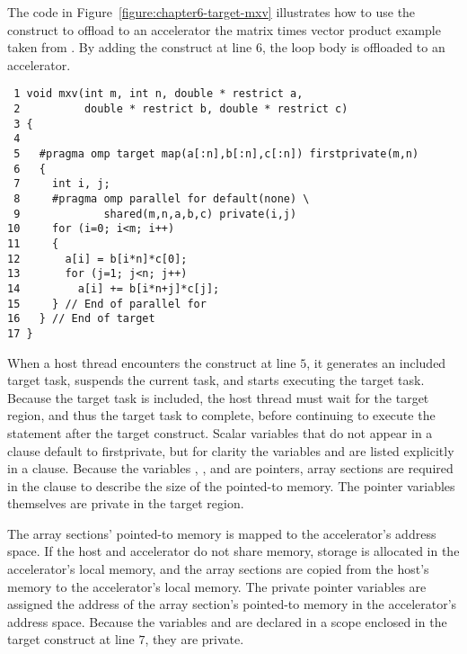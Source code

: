 The code in Figure~\ref{figure:chapter6-target-mxv} illustrates how to
use the  construct to offload to an accelerator the matrix times
vector product example taken from \cite{ChapmanEtAl:2007}.  By adding
the  construct at line $6$, the loop body is offloaded to an
accelerator.

\begin{figure*}[!tb]
\begin{verbatim}
 1 void mxv(int m, int n, double * restrict a,
 2          double * restrict b, double * restrict c)
 3 {
 4 
 5   #pragma omp target map(a[:n],b[:n],c[:n]) firstprivate(m,n)
 6   {
 7     int i, j;
 8     #pragma omp parallel for default(none) \
 9             shared(m,n,a,b,c) private(i,j)
10     for (i=0; i<m; i++)
11     {
12       a[i] = b[i*n]*c[0];
13       for (j=1; j<n; j++)
14         a[i] += b[i*n+j]*c[j];
15     } // End of parallel for
16   } // End of target
17 }
\end{verbatim}
\caption{ \textbf {Example using the target construct to execute the matrix 
                   times vector on an accelerator} -- \small
          The host thread waits for the execution of the target region to
          finish before it continues after the construct.
         }
\label{figure:chapter6-target-mxv}
\end{figure*}

When a host thread encounters the  construct at line $5$, it generates an
included target task, suspends the current task, and starts executing the
target task.  Because the target task is included, the host thread must
wait for the target region, and thus the target task to complete, before
continuing to execute the statement after the target construct.
Scalar variables that do not appear in a  clause default to
firstprivate, but for clarity the variables \code{m} and \code{n} are listed 
explicitly in a clause.
Because the variables , , and  are pointers, array sections are
required in the \code{map} clause to describe the size of the pointed-to
memory.  The pointer variables themselves are private in the target region.  

The array sections' pointed-to memory is mapped to the accelerator's address
space.
If the host and accelerator do not share memory, storage is allocated in the
accelerator's local memory, and the array sections are copied from the host's
memory to the accelerator's local memory.
The private pointer variables are assigned the address of the array section's
pointed-to memory in the accelerator's address space.
Because the variables  and  are declared in a scope enclosed in the
target construct at line $7$, they are private.


